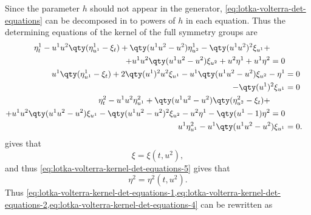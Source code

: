Since the parameter \(h\) should not appear in the generator, \cref{eq:lotka-volterra-det-equations} can be decomposed in to powers of \(h\) in each equation.
Thus the determining equations of the kernel of the full symmetry groups are
\begin{subequations}\label{eq:lotka-volterra-kernel-det-equations}
  \begin{align}
    \begin{split}\label{eq:lotka-volterra-kernel-det-equations-1}
      \eta^1_t - u^1 u^2 \qty(\eta^1_{u^1} - \xi_t) + \qty(u^1 u^2 - u^2) \eta^1_{u^2} - \qty(u^1 u^2)^2 \xi_{u^1} +&\\
      + u^1 u^2 \qty(u^1 u^2 - u^2) \xi_{u^2} + u^2 \eta^1 + u^1 \eta^2 &= 0
    \end{split}\\
    \label{eq:lotka-volterra-kernel-det-equations-2}
    u^1 \qty(\eta^1_{u^1} - \xi_t) + 2 \qty(u^1)^2 u^2 \xi_{u^1} - u^1 \qty(u^1 u^2 - u^2) \xi_{u^2} - \eta^1 &= 0 \\
    \label{eq:lotka-volterra-kernel-det-equations-3}
    - \qty(u^1)^2 \xi_{u^1} &= 0 \\
    \begin{split}\label{eq:lotka-volterra-kernel-det-equations-4}
      \eta^2_t - u^1 u^2 \eta^2_{u^1} + \qty(u^1 u^2 - u^2) \qty(\eta^2_{u^2} - \xi_t) +&\\
      + u^1 u^2 \qty(u^1 u^2 - u^2) \xi_{u^1} - \qty(u^1 u^2 - u^2)^2 \xi_{u^2} - u^2 \eta^1 - \qty(u^1 - 1) \eta^2 &= 0
    \end{split}\\
    \label{eq:lotka-volterra-kernel-det-equations-5}
    u^1 \eta^2_{u^1} - u^1 \qty(u^1 u^2 - u^2) \xi_{u^1} &= 0. 
  \end{align}
\end{subequations}
 gives that
\begin{equation}
  \xi = \xi(t, u^2),
\end{equation}
and thus \cref{eq:lotka-volterra-kernel-det-equations-5} gives that
\begin{equation}
  \eta^2 = \eta^2(t, u^2).
\end{equation}
Thus \cref{eq:lotka-volterra-kernel-det-equations-1,eq:lotka-volterra-kernel-det-equations-2,eq:lotka-volterra-kernel-det-equations-4} can be rewritten as
